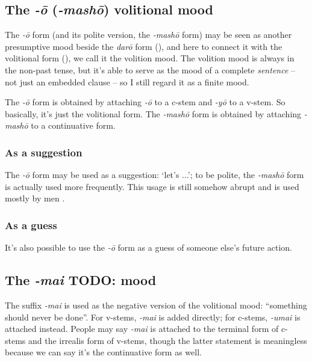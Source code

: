 \documentclass[UTF8, a4paper, oneside, scheme=plain]{ctexrep}
\newcommand*{\citepage}[1]{pp.~{#1}}
\newcommand{\corpus}[1]{\emph{#1}}
\newcommand{\translate}[1]{`#1'}
\begin{document}
\subsection{The \corpus{-\={o}} (\corpus{-mash\={o}}) volitional mood}\label{sec:volition-mood}

The \corpus{-\={o}} form (and its polite version, the \corpus{-mash\={o}} form) 
may be seen as another presumptive mood beside the \corpus{dar\={o}} form (),
and here to connect it with the volitional form (),
we call it the volition mood.
The volition mood is always in the non-past tense,
but it's able to serve as the mood of a complete \emph{sentence} -- not just an embedded clause --
so I still regard it as a finite mood. 

The \corpus{-\={o}} form is obtained by attaching \corpus{-\={o}} to a c-stem 
and \corpus{-y\={o}} to a v-stem.
So basically, it's just the volitional form.
The \corpus{-mash\={o}} form is obtained by attaching \corpus{-mash\={o}} to a continuative form.

\subsubsection{As a suggestion}

The \corpus{-\={o}} form may be used as a suggestion: \translate{let's ...};
to be polite, the \corpus{-mash\={o}} form is actually used more frequently.
This usage is still somehow abrupt and is used mostly by men \citep[\citepage{112}]{akiyama2012japanese}.

\subsubsection{As a guess}

It's also possible to use the \corpus{-\={o}} form as a guess of someone else's future action.

\subsection{The \corpus{-mai} TODO: mood}\label{sec:mai-mood}

The suffix \corpus{-mai} is used as the negative version of the volitional mood:
``something should never be done''.
For v-stems, \corpus{-mai} is added directly;
for c-stems, \corpus{-umai} is attached instead.
People may say \corpus{-mai} is attached to the terminal form of c-stems 
and the irrealis form of v-stems,
though the latter statement is meaningless because we can say it's the continuative form as well.
\end{document}
